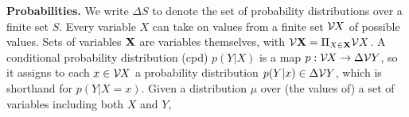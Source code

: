 \documentclass[twoside]{article}
\begin{document}
    \textbf{Probabilities.}
We write $\Delta S$ to denote the set of probability distributions over a finite set $S$.
Every variable $X$ can take on values from a finite set $\mathcal V\mskip-1.5mu X$ of possible values.
Sets of variables $\mathbf{X}$ are variables themselves, with
$\mathcal V \mathbf{X} = \Pi_{X \in \mathbf{X}} \mathcal V X$.
A conditional probability distribution (cpd) $p(Y|X)$ is a map
$p : \mathcal V\mskip-1.5mu  X \to \Delta \mathcal V Y$, so it assigns to each $x \in \mathcal V\mskip-1.5mu X$ a
probability distribution $p(Y|x) \in \Delta \mathcal V Y$, which is shorthand for $p(Y|X\!\!=\!x)$.
Given a distribution $\mu$ over (the values of) a set of variables including both $X$ and $Y$,
\end{document}
